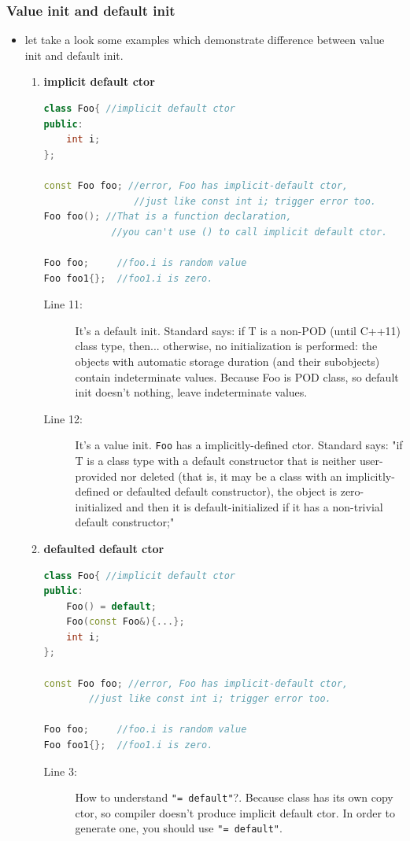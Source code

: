 \documentclass[a4paper,11pt,twoside]{book}
\begin{document}
\subsubsection{Value init and default init}
\begin{itemize}
 
	\item let take a look some examples which demonstrate difference between value init and default init.
	\begin{enumerate}
		\item \textbf{implicit default ctor}
\begin{lstlisting}[frame=single, language=c++]
class Foo{ //implicit default ctor
public:
	int i;
};

const Foo foo; //error, Foo has implicit-default ctor, 
				//just like const int i; trigger error too.
Foo foo(); //That is a function declaration, 
			//you can't use () to call implicit default ctor.

Foo foo;     //foo.i is random value
Foo foo1{};	 //foo1.i is zero.		 
\end{lstlisting}
\begin{description}			
\item[Line 11:]	 It's a default init. Standard says: if T is a non-POD (until C++11) class type, then... otherwise, no initialization is performed: the objects with automatic storage duration (and their subobjects) contain indeterminate values.
Because Foo is POD class, so default init doesn't nothing, leave indeterminate values.

\item[Line 12:]  It's a value init. \texttt{Foo} has a implicitly-defined ctor. Standard says: "if T is a class type with a default constructor that is neither user-provided nor deleted (that is, it may be a class with an implicitly-defined or defaulted default constructor), the object is zero-initialized and then it is default-initialized if it has a non-trivial default constructor;"
\end{description}

		\item \textbf{defaulted default ctor}
\begin{lstlisting}[frame=single, language=c++]
class Foo{ //implicit default ctor
public:
	Foo() = default;
	Foo(const Foo&){...};
	int i;
};
	
const Foo foo; //error, Foo has implicit-default ctor, 
		//just like const int i; trigger error too.
	
Foo foo;     //foo.i is random value
Foo foo1{};	 //foo1.i is zero.		 
\end{lstlisting}
\begin{description}			
	\item[Line 3:]  How to understand \texttt{"= default"}?. Because class has its own copy ctor, so compiler doesn't produce implicit default ctor. In order to generate one, you should use \texttt{"= default"}.
	

\end{description}
\end{enumerate}
\end{itemize}
\end{document}
